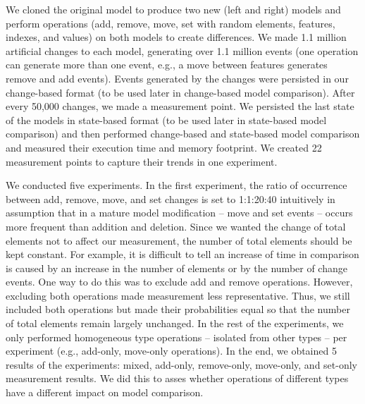 \documentclass{jot}
\newcommand{\dk}[1]{\textcolor{blue}{\textbf{[Dimitris: #1]}}}
\begin{document}
    We cloned the original model to produce two new (left and right) models and perform operations (\textsf{add}, \textsf{remove}, \textsf{move}, \textsf{set} with random elements, features, indexes, and values) on both models to create differences. We made 1.1 million artificial changes to each model, generating over 1.1 million events (one operation can generate more than one event, e.g., a \textsf{move} between features generates \textsf{remove} and \textsf{add} events). Events generated by the changes were persisted in our change-based format (to be used later in change-based model comparison). After every 50,000 changes, we made a measurement point. We persisted the last state of the models in state-based format (to be used later in state-based model comparison) and then performed change-based and state-based model comparison and measured their execution time and memory footprint. We created 22 measurement points to capture their trends in one experiment. 
    
    We conducted five experiments.
    In the first experiment, the ratio of occurrence between \textsf{add}, \textsf{remove}, \textsf{move}, and \textsf{set} changes is set to 1:1:20:40 intuitively in assumption that in a mature model modification -- \textsf{move} and \textsf{set} events -- occurs more frequent than addition and deletion. Since we wanted the change of total elements not to affect our measurement, the number of total elements should be kept constant. For example, it is difficult to tell an increase of time in comparison is caused by an increase in the number of elements or by the number of change events. One way to do this was to exclude \textsf{add} and \textsf{remove} operations. However, excluding both operations made measurement less representative. Thus, we still included both operations but made their probabilities equal so that the number of total elements remain largely unchanged. In the rest of the experiments,
    we only performed homogeneous type operations -- isolated from other types -- per experiment (e.g., add-only, move-only operations). In the end, we obtained 5 results of the experiments: mixed, add-only, remove-only, move-only, and set-only measurement results. We did this to asses whether operations of different types have a different impact on model comparison.
    
\end{document}
